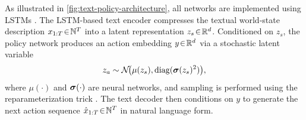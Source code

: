 As illustrated in \cref{fig:text-policy-architecture}, all networks are implemented using LSTMs \citep{HochreiterS1997}. The LSTM-based text encoder compresses the textual world-state description $x_{1:T} \!\in\! \mathbb{N}^T$ into a latent representation $z_s \!\in\! \mathbb{R}^d$. Conditioned on $z_s$, the policy network produces an action embedding $y \!\in\! \mathbb{R}^d$ via a stochastic latent variable
\[
z_a \sim \mathcal{N}\!\big(\mu(z_s), \operatorname{diag}(\boldsymbol \sigma(z_s)^2)\big),
\]
where $\mu(\cdot)$ and $\boldsymbol \sigma(\cdot)$ are neural networks, and sampling is performed using the reparameterization trick \citep{KingmaW13}. The text decoder then conditions on $y$ to generate the next action sequence $\hat{x}_{1:T} \!\in\! \mathbb{N}^T$ in natural language form.





%
